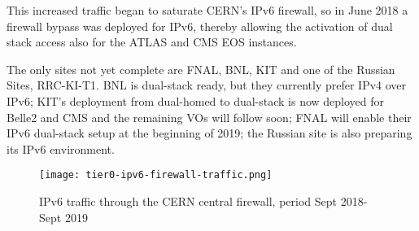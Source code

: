 This increased traffic began to saturate CERN's IPv6 firewall, so in June 2018 a
firewall bypass was deployed for IPv6,
thereby allowing the activation of dual stack access also for the ATLAS and CMS EOS instances.    
 


The only sites not yet complete are FNAL, BNL, KIT and one of the Russian Sites, RRC-KI-T1. 
BNL is dual-stack ready, but they currently prefer IPv4 over IPv6; KIT's deployment from dual-homed to dual-stack is now deployed for Belle2 and CMS and the remaining VOs will follow soon; 
FNAL will enable their IPv6 dual-stack setup at the beginning of 2019; the Russian site is also preparing its IPv6 environment.



\begin{figure}[h!]
\centering
\texttt{[image: tier0-ipv6-firewall-traffic.png]}
\caption{IPv6 traffic through the CERN central firewall, period Sept 2018-Sept 2019}
\label{fig:tier0-traffic}
\end{figure}
